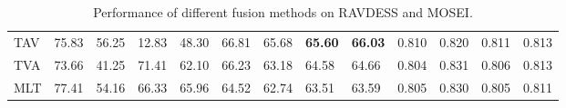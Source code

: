 \documentclass[a4paper,conference]{IEEEtran}
\begin{document}
\begin{table}[h]
\begin{tabular}{|p{12pt}|p{12pt}p{13pt}p{13pt}p{14pt}|p{12pt}p{13pt}p{13pt}p{14pt}|p{12pt}p{13pt}p{13pt}p{14pt}|}
\multicolumn{1}{|l|}{TAV}      & 75.83          & 56.25          & 12.83          & {48.30}          & 66.81          & 65.68          & \textbf{65.60}   & {\textbf{66.03}} & 0.810          & 0.820           & 0.811          & {0.813}          \\
\multicolumn{1}{|l|}{TVA}      & 73.66          & 41.25          & 71.41          & {62.10}          & 66.23          & 63.18          & 64.58           & {64.66}          & 0.804          & 0.831          & 0.806          & {0.813}          \\
\multicolumn{1}{|l|}{MLT}     & 77.41          & 54.16          & 66.33          & {65.96}          & 64.52          & 62.74          & 63.51           & {63.59}          & 0.805          & 0.830          & 0.805          & {0.811}          \\ \hline
\end{tabular}
\caption{Performance of different fusion methods on RAVDESS and MOSEI.}
\end{table}
\end{document}
